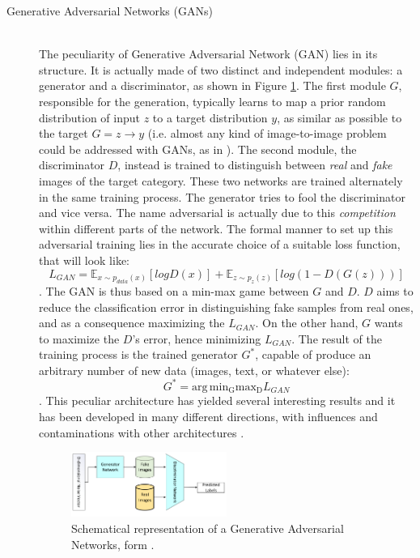 \begin{description}
    \item [Generative Adversarial Networks (GANs)] \hfill \\
        The peculiarity of Generative Adversarial Network (GAN) lies in its structure. It is actually made of two distinct and independent modules: a generator and a discriminator, as shown in Figure \ref{fig:GAN}. The first module $G$, responsible for the generation, typically learns to map a prior random distribution of input $z$ to a target distribution $y$, as similar as possible to the target $G = z \rightarrow y$ (i.e. almost any kind of image-to-image problem could be addressed with GANs, as in \cite{1611.07004}). The second module, the discriminator $D$, instead is trained to distinguish between \textit{real} and \textit{fake} images of the target category. These two networks are trained alternately in the same training process. The generator tries to fool the discriminator and vice versa. The name adversarial is actually due to this \textit{competition} within different parts of the network. The formal manner to set up this adversarial training lies in the accurate choice of a suitable loss function, that will look like: $$L_{GAN} = \mathbb{E}_{x \sim p_{data}(x)}[logD(x)] + \mathbb{E}_{z \sim p_{z}(z)}[log(1-D(G(z)))]$$.
        The GAN is thus based on a min-max game between $G$ and $D$. $D$ aims to reduce the classification error in distinguishing fake samples from real ones, and as a consequence maximizing the $L_{GAN}$. On the other hand, $G$ wants to maximize the $D$'s error, hence minimizing $L_{GAN}$. The result of the training process is the trained generator $G^*$, capable of produce an arbitrary number of new data (images, text, or whatever else): $$ G^* = \operatorname*{arg\,min_Gmax_D} L_{GAN}$$.
        This peculiar architecture has yielded several interesting results and it has been developed in many different directions, with influences and contaminations with other architectures \cite{1611.07004}.

        \begin{figure}
            \centering
            \includegraphics[width = 0.5\textwidth]{images/GAN}
            \caption{Schematical representation of a Generative Adversarial Networks, form \cite{deep_seg_SOA}.}
            \label{fig:GAN}
        \end{figure}


\end{description}

